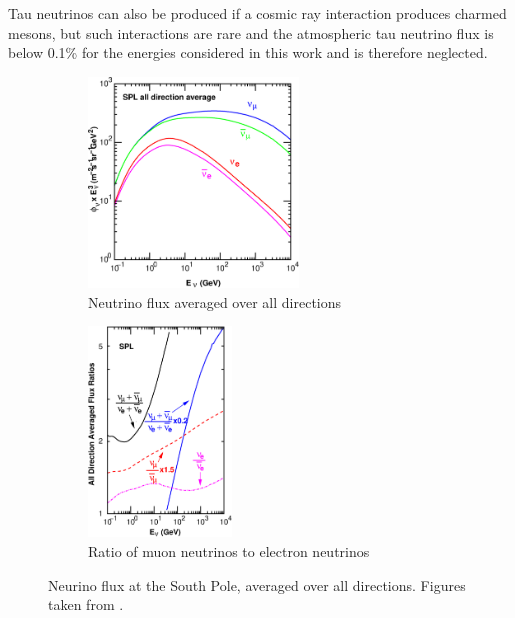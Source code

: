 Tau neutrinos can also be produced if a cosmic ray interaction produces charmed mesons, but such interactions are rare and the atmospheric tau neutrino flux is below 0.1\% for the energies considered in this work\cite{fedynitch2015calculation} and is therefore neglected.
\begin{figure}
\centering
\begin{subfigure}[t]{0.55\linewidth}
    \includegraphics[height=2.2in]{figures/flux/alldir-spl.eps}
\caption{Neutrino flux averaged over all directions\label{fig:flux-alldir}}
\end{subfigure}
\hfill
\begin{subfigure}[t]{0.35\linewidth}
    \includegraphics[height=2.2in]{figures/flux/spl-ratio-ally.eps}
\caption{Ratio of muon neutrinos to electron neutrinos\label{fig:flux-numu-ratio}}
\end{subfigure}
\caption{Neurino flux at the South Pole, averaged over all directions. Figures taken from \cite{Honda:2015fha}.}
\end{figure}


